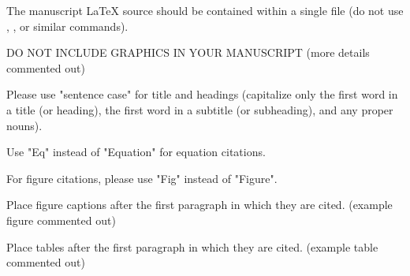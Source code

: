 \documentclass[10pt,letterpaper]{article}
\newlength\savedwidth
\newcommand\thickhline{\noalign{\global\savedwidth\arrayrulewidth\global\arrayrulewidth 2pt}%
	\hline
	\noalign{\global\arrayrulewidth\savedwidth}}
\begin{document}
	The manuscript LaTeX source should be contained within a single file (do not use \verb*||, \verb*||, or similar commands).
	
	DO NOT INCLUDE GRAPHICS IN YOUR MANUSCRIPT (more details commented out)
	
	Please use "sentence case" for title and headings (capitalize only the first word in a title (or heading), the first word in a subtitle (or subheading), and any proper nouns).
	
	Use "Eq" instead of "Equation" for equation citations.
	
	For figure citations, please use "Fig" instead of "Figure".
	
	Place figure captions after the first paragraph in which they are cited. (example figure commented out)
	
	Place tables after the first paragraph in which they are cited. (example table commented out)
	
\end{document}
